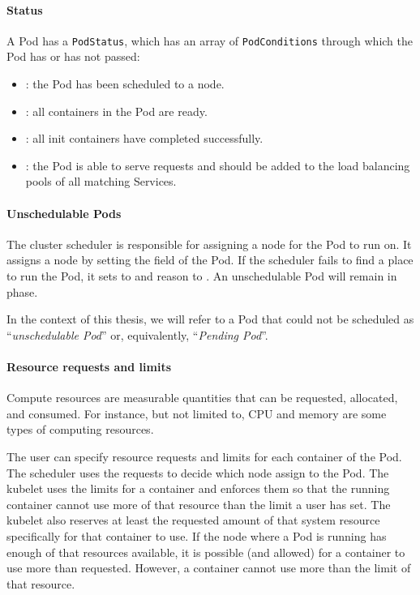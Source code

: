 \paragraph*{Status}
\label{section:unschedulable-Pod}
A Pod has a \texttt{PodStatus}, which has an array of \texttt{PodConditions}
through which the Pod has or has not passed:
\begin{itemize}
	\tightlist
	\item {}: the Pod has been scheduled to a node.
	\item {}: all containers in the Pod are ready.
	\item {}: all init containers have completed successfully.
	\item {}: the Pod is able to serve requests and should be added to
	      the load balancing pools of all matching Services.
\end{itemize}

\paragraph*{Unschedulable Pods}
\label{section:Pod-unschedulable}

The cluster scheduler is responsible for assigning a node for the Pod to run on.
It assigns a node by setting the  field of the Pod. If the
scheduler fails to find a place to run the Pod, it sets 
 to  and reason to . An
unschedulable Pod will remain in  phase.

In the context of this thesis, we will refer to a Pod that could not be
scheduled  as ``\textit{unschedulable Pod}'' or, equivalently, ``\textit{Pending
Pod}''.
\paragraph*{Resource requests and limits}
\label{section:pod-requests}

Compute resources are measurable quantities that can be requested, allocated,
and consumed. For instance, but not limited to, CPU and memory are some types of
computing resources.

The user can specify resource requests and limits for each container of the Pod.
The scheduler uses the requests to decide which node assign to the Pod. The
kubelet uses the limits for a container and enforces them so that the running
container cannot use more of that resource than the limit a user has set. The
kubelet also reserves at least the requested amount of that system resource
specifically for that container to use. If the node where a Pod is running has
enough of that resources available, it is possible (and allowed) for a container
to use more than requested. However, a container cannot use more than the limit
of that resource.

